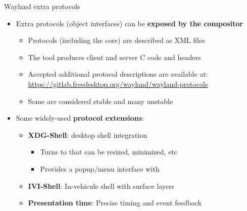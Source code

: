 \begin{frame}{Wayland extra protocols}
  \begin{itemize}
  \item Extra protocols (object interfaces) can be \textbf{exposed by the compositor}
    \begin{itemize}
    \item Protocols (including the core) are described as XML files
    \item The  tool produces client and server C code and headers
    \item Accepted additional protocol descriptions are available at:
      \url{https://gitlab.freedesktop.org/wayland/wayland-protocols}
    \item Some are considered stable and many unstable
    \end{itemize}
  \item Some widely-used \textbf{protocol extensions}:
    \begin{itemize}
    \item \textbf{XDG-Shell}: desktop shell integration
      \begin{itemize}
      \item Turns  to  that can be resized, minimized, etc
      \item Provides a popup/menu interface with 
      \end{itemize}
    \item \textbf{IVI-Shell}: In-vehicule shell with surface layers
    \item \textbf{Presentation time}: Precise timing and event feedback
    \end{itemize}
  \end{itemize}
\end{frame}

